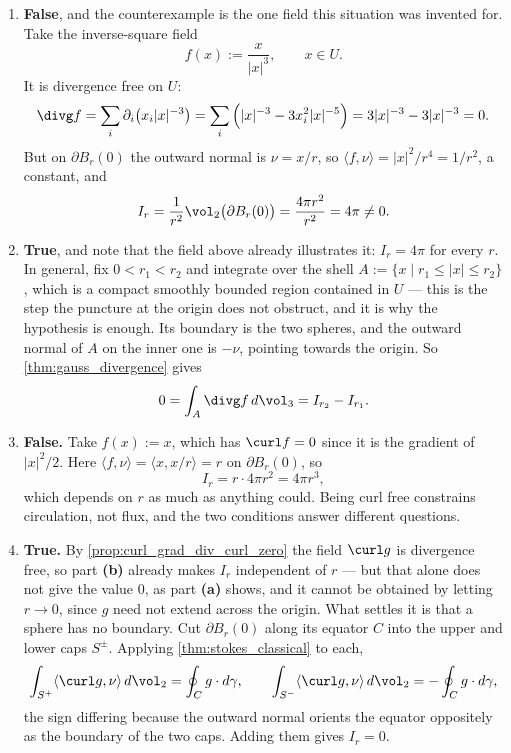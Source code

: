 \begin{exercisesolution}
\label{sol:flux_through_nested_spheres}
\begin{enumerate}[label=\textbf{(\alph*)}]
  \item \textbf{False}, and the counterexample is the one field this situation was invented for.
    Take the inverse-square field
    \[f(x) := \frac{x}{\lvert x\rvert^3}, \qquad x \in U .\]
    It is divergence free on $U$:
    \[\divg f = \sum_i \partial_i\big(x_i\lvert x\rvert^{-3}\big)
      = \sum_i\Big(\lvert x\rvert^{-3} - 3x_i^2\lvert x\rvert^{-5}\Big)
      = 3\lvert x\rvert^{-3} - 3\lvert x\rvert^{-3} = 0 .\]
    But on $\partial B_r(0)$ the outward normal is $\nu = x/r$, so
    $\langle f,\nu\rangle = \lvert x\rvert^2/r^4 = 1/r^2$, a constant, and
    \[I_r = \frac{1}{r^2}\vol_2\big(\partial B_r(0)\big) = \frac{4\pi r^2}{r^2} = 4\pi \neq 0 .\]
  \item \textbf{True}, and note that the field above already illustrates it: $I_r = 4\pi$ for
    every $r$. In general, fix $0 < r_1 < r_2$ and integrate over the shell
    $A := \{x \mid r_1 \leq \lvert x\rvert \leq r_2\}$, which is a compact smoothly bounded region
    contained in $U$ --- this is the step the puncture at the origin does not obstruct, and it is
    why the hypothesis is enough. Its boundary is the two spheres, and the outward normal of $A$
    on the inner one is $-\nu$, pointing towards the origin. So \cref{thm:gauss_divergence} gives
    \[0 = \int_A \divg f\,d\vol_3 = I_{r_2} - I_{r_1} .\]
  \item \textbf{False.} Take $f(x) := x$, which has $\curl f = 0$ since it is the gradient of
    $\lvert x\rvert^2/2$. Here $\langle f,\nu\rangle = \langle x, x/r\rangle = r$ on
    $\partial B_r(0)$, so
    \[I_r = r\cdot 4\pi r^2 = 4\pi r^3 ,\]
    which depends on $r$ as much as anything could. Being curl free constrains circulation, not
    flux, and the two conditions answer different questions.
  \item \textbf{True.} By \cref{prop:curl_grad_div_curl_zero} the field $\curl g$ is divergence
    free, so part \textbf{(b)} already makes $I_r$ independent of $r$ --- but that alone does not
    give the value $0$, as part \textbf{(a)} shows, and it cannot be obtained by letting
    $r \to 0$, since $g$ need not extend across the origin. What settles it is that a sphere has
    no boundary. Cut $\partial B_r(0)$ along its equator $C$ into the upper and lower caps
    $S^{\pm}$. Applying \cref{thm:stokes_classical} to each,
    \[\int_{S^+}\langle\curl g,\nu\rangle\,d\vol_2 = \oint_{C} g\cdot d\gamma,
      \qquad
      \int_{S^-}\langle\curl g,\nu\rangle\,d\vol_2 = -\oint_{C} g\cdot d\gamma,\]
    the sign differing because the outward normal orients the equator oppositely as the boundary
    of the two caps. Adding them gives $I_r = 0$.
\end{enumerate}


\end{exercisesolution}
